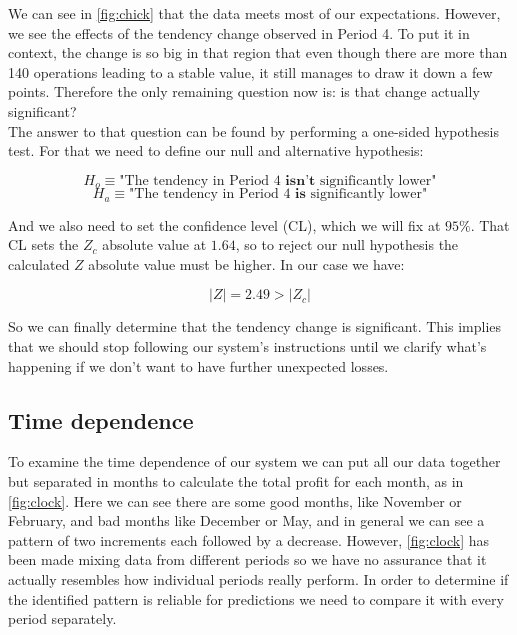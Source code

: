 \documentclass[sigconf, nonacm]{acmart}
\begin{document}
We can see in \autoref{fig:chick} that the data meets most of our expectations. However, we see the effects of the tendency change observed in Period 4. To put it in context, the change is so big in that region that even though there are more than 140 operations leading to a stable value, it still manages to draw it down a few points. Therefore the only remaining question now is: is that change actually significant? \\

The answer to that question can be found by performing a one-sided hypothesis test. For that we need to define our null and alternative hypothesis:

\begin{equation*}
    H_o \equiv \text{"The tendency in Period 4} \textbf{ isn't } \text{significantly lower"}
\end{equation*}
\begin{equation*}
    H_a \equiv \text{"The tendency in Period 4} \textbf{ is } \text{significantly lower"}
\end{equation*}

And we also need to set the confidence level (CL), which we will fix at $95\%$. That CL sets the $Z_c$ absolute value at $1.64$, so to reject our null hypothesis the calculated $Z$ absolute value must be higher. In our case we have:

\begin{equation*}
    |Z| = 2.49 > |Z_c|
\end{equation*}

So we can finally determine that the tendency change is significant. This implies that we should stop following our system's instructions until we clarify what's happening if we don't want to have further unexpected losses.

\subsection{Time dependence}

To examine the time dependence of our system we can put all our data together but separated in months to calculate the total profit for each month, as in \autoref{fig:clock}. Here we can see there are some good months, like November or February, and bad months like December or May, and in general we can see a pattern of two increments each followed by a decrease. However, \autoref{fig:clock} has been made mixing data from different periods so we have no assurance that it actually resembles how individual periods really perform. In order to determine if the identified pattern is reliable for predictions we need to compare it with every period separately.
\end{document}
